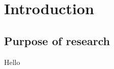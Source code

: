 \chapter{Introduction}
\setcounter{page}{1}
\section{Purpose of research}
\label{subsec:intro}
Hello

